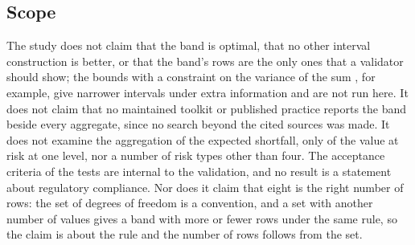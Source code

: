 \subsection{Scope}
\label{sec:limits-scope}

The study does not claim that the band is optimal, that no other interval construction is better, or that the band's rows are the
only ones that a validator should show; the bounds with a constraint on the variance of the sum \citep{brv2015}, for example, give
narrower intervals under extra information and are not run here. It does not claim that no maintained toolkit or published practice
reports the band beside every aggregate, since no search beyond the cited sources was made. It does not examine the aggregation of
the expected shortfall, only of the value at risk at one level, nor a number of risk types other than four. The acceptance criteria
of the tests are internal to the validation, and no result is a statement about regulatory compliance. Nor does it claim that eight
is the right number of rows: the set of degrees of freedom is a convention, and a set with another number of values gives a band
with more or fewer rows under the same rule, so the claim is about the rule and the number of rows follows from the set.
